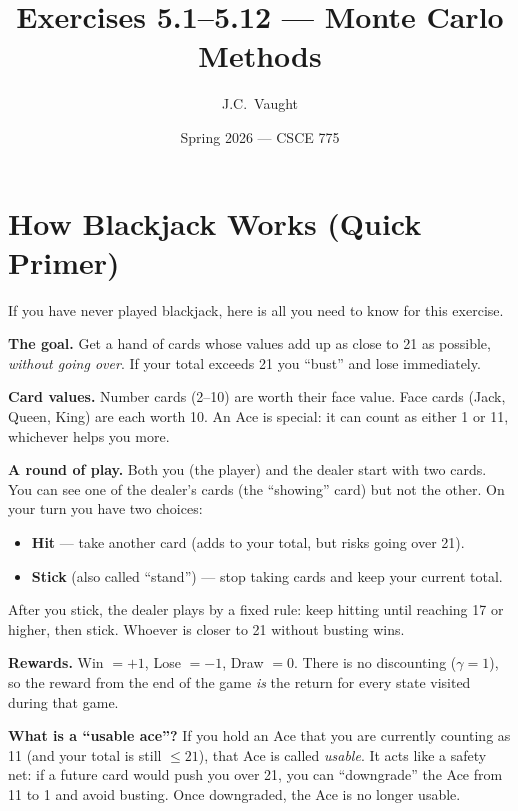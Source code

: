 \documentclass[11pt]{article}
\title{\color{garnet}\textbf{Exercises 5.1--5.12 --- Monte Carlo Methods}}
\author{J.C.\ Vaught}
\date{Spring 2026 --- CSCE 775}
\begin{document}
\maketitle

\section*{How Blackjack Works (Quick Primer)}

If you have never played blackjack, here is all you need to know for this exercise.

\textbf{The goal.} Get a hand of cards whose values add up as close to 21 as possible, \textit{without going over}. If your total exceeds 21 you ``bust'' and lose immediately.

\textbf{Card values.} Number cards (2--10) are worth their face value. Face cards (Jack, Queen, King) are each worth 10. An Ace is special: it can count as either 1 or 11, whichever helps you more.

\textbf{A round of play.} Both you (the player) and the dealer start with two cards. You can see one of the dealer's cards (the ``showing'' card) but not the other. On your turn you have two choices:
\begin{itemize}[nosep]
    \item \textbf{Hit} --- take another card (adds to your total, but risks going over 21).
    \item \textbf{Stick} (also called ``stand'') --- stop taking cards and keep your current total.
\end{itemize}
After you stick, the dealer plays by a fixed rule: keep hitting until reaching 17 or higher, then stick. Whoever is closer to 21 without busting wins.

\textbf{Rewards.} Win $= +1$, Lose $= -1$, Draw $= 0$. There is no discounting ($\gamma = 1$), so the reward from the end of the game \textit{is} the return for every state visited during that game.

\textbf{What is a ``usable ace''?} If you hold an Ace that you are currently counting as 11 (and your total is still $\leq 21$), that Ace is called \textit{usable}. It acts like a safety net: if a future card would push you over 21, you can ``downgrade'' the Ace from 11 to 1 and avoid busting. Once downgraded, the Ace is no longer usable.

\end{document}
